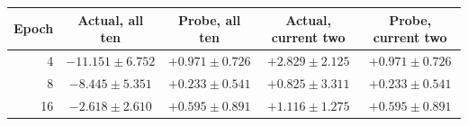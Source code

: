 \begin{tabular}{rcccc}
\toprule
Epoch & Actual, all ten & Probe, all ten & Actual, current two & Probe, current two \\
\midrule
4 & $-11.151 \pm 6.752$ & $+0.971 \pm 0.726$ & $+2.829 \pm 2.125$ & $+0.971 \pm 0.726$ \\
8 & $-8.445 \pm 5.351$ & $+0.233 \pm 0.541$ & $+0.825 \pm 3.311$ & $+0.233 \pm 0.541$ \\
16 & $-2.618 \pm 2.610$ & $+0.595 \pm 0.891$ & $+1.116 \pm 1.275$ & $+0.595 \pm 0.891$ \\
\bottomrule
\end{tabular}

